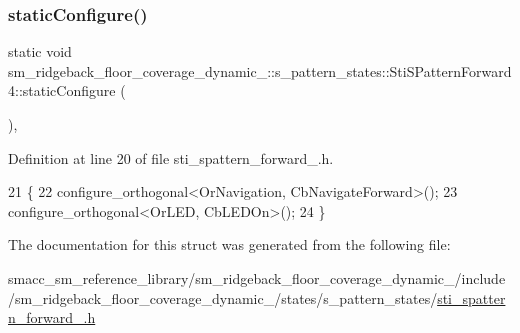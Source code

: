 \subsubsection{\texorpdfstring{static\+Configure()}{staticConfigure()}}
{\footnotesize\ttfamily static void sm\+\_\+ridgeback\+\_\+floor\+\_\+coverage\+\_\+dynamic\+\_\+::s\+\_\+pattern\+\_\+states\+::\+Sti\+S\+Pattern\+Forward4\+::static\+Configure (\begin{DoxyParamCaption}{ }\end{DoxyParamCaption})\hspace{0.3cm}{\ttfamily [inline]}, {\ttfamily [static]}}



Definition at line 20 of file sti\+\_\+spattern\+\_\+forward\+\_.\+h.


\begin{DoxyCode}
21       \{
22         configure\_orthogonal<OrNavigation, CbNavigateForward>();
23         configure\_orthogonal<OrLED, CbLEDOn>();
24       \}
\end{DoxyCode}


The documentation for this struct was generated from the following file\+:\begin{DoxyCompactItemize}
\item 
smacc\+\_\+sm\+\_\+reference\+\_\+library/sm\+\_\+ridgeback\+\_\+floor\+\_\+coverage\+\_\+dynamic\+\_/include/sm\+\_\+ridgeback\+\_\+floor\+\_\+coverage\+\_\+dynamic\+\_/states/s\+\_\+pattern\+\_\+states/\hyperlink{sm__ridgeback__floor__coverage__dynamic__1_2include_2sm__ridgeback__floor__coverage__dynamic__1_efa2ad2e75305e4ec7f575a8390094e3}{sti\+\_\+spattern\+\_\+forward\+\_.\+h}\end{DoxyCompactItemize}
